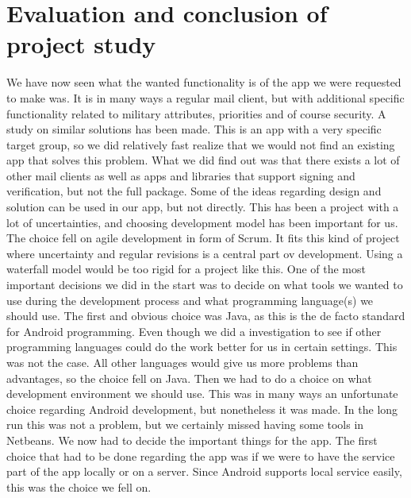 \pagebreak
\section{Evaluation and conclusion of project study}
We have now seen what the wanted functionality is of the app we were requested to make was. It is in many ways a regular mail client, but with additional specific functionality related to military attributes, priorities and of course security. A study on similar solutions has been made. This is an app with a very specific target group, so we did relatively fast realize that we would not find an existing app that solves this problem. What we did find out was that there exists a lot of other mail clients as well as apps and libraries that support signing and verification, but not the full package.  Some of the ideas regarding design and solution can be used in our app, but not directly.
\newline\newline
This has been a project with a lot of uncertainties, and choosing development model has been important for us. The choice fell on agile development in form of Scrum. It fits this kind of project where uncertainty and regular revisions is a central part ov development. Using a waterfall model would be too rigid for a project like this.
\newline\newline
One of the most important decisions we did in the start was to decide on what tools we wanted to use during the development process and what programming language(s) we should use. The first and obvious choice was Java, as this is the de facto standard for Android programming. Even though we did a investigation to see if other programming languages could do the work better for us in certain settings. This was not the case. All other languages would give us more problems than advantages, so the choice fell on Java. Then we had to do a choice on what development environment we should use. This was in many ways an unfortunate choice regarding Android development, but nonetheless it was made. In the long run this was not a problem, but we certainly missed having some tools in Netbeans. We now had to decide the important things for the app.
\newline\newline
The first choice that had to be done regarding the app was if we were to have the service part of the app locally or on a server. Since Android supports local service easily, this was the choice we fell on.
